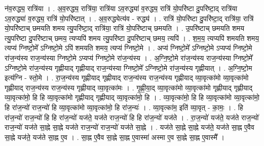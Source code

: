 \documentclass[17pt]{extarticle}
\begin{document}
न॑व॒रुद्ध्य॒ रात्रि॑या । . अ॒व॒रुद्ध्य॒ रात्रि॑या॒ रात्रि॑या ऽव॒रुद्ध्या॑ व॒रुद्ध्य॒ रात्रि॑ यो॒परि॑ष्टा दु॒परि॑ष्टा॒द् रात्रि॑या ऽव॒रुद्ध्या॑ व॒रुद्ध्य॒ रात्रि॑ यो॒परि॑ष्टात् । . अ॒व॒रुद्ध्येत्य॑व - रुद्ध्य॑ । . रात्रि॑ यो॒परि॑ष्टा दु॒परि॑ष्टा॒द् रात्रि॑या॒ रात्रि॑ यो॒परि॑ष्टाच् छमयति शमय त्यु॒परि॑ष्टा॒द् रात्रि॑या॒ रात्रि॑
यो॒परि॑ष्टाच् छमयति । . उ॒परि॑ष्टाच् छमयति शमय त्यु॒परि॑ष्टा दु॒परि॑ष्टाच् छमय॒ त्यप्यपि॑ शमय त्यु॒परि॑ष्टा दु॒परि॑ष्टाच् छमय॒ त्यपि॑ । . श॒म॒य॒ त्यप्यपि॑ शमयति शमय॒ त्यप्य॑ ग्निष्टो॒मे᳚ ऽग्निष्टो॒मे ऽपि॑ शमयति शमय॒ त्यप्य॑ ग्निष्टो॒मे । . अप्य॑ ग्निष्टो॒मे᳚ ऽग्निष्टो॒मे ऽप्यप्य॑ ग्निष्टो॒मे रा॑ज॒न्य॑स्य राज॒न्य॑स्या ग्निष्टो॒मे ऽप्यप्य॑ ग्निष्टो॒मे रा॑ज॒न्य॑स्य । . अ॒ग्नि॒ष्टो॒मे रा॑ज॒न्य॑स्य राज॒न्य॑स्या ग्निष्टो॒मे᳚ ऽग्निष्टो॒मे रा॑ज॒न्य॑स्य गृह्णीयाद् गृह्णीयाद् राज॒न्य॑स्या ग्निष्टो॒मे᳚ ऽग्निष्टो॒मे रा॑ज॒न्य॑स्य गृह्णीयात् । . अ॒ग्नि॒ष्टो॒म इत्य॑ग्नि - स्तो॒मे । . रा॒ज॒न्य॑स्य गृह्णीयाद् गृह्णीयाद् राज॒न्य॑स्य राज॒न्य॑स्य गृह्णीयाद् व्या॒वृत्का॑मो व्या॒वृत्का॑मो गृह्णीयाद् राज॒न्य॑स्य राज॒न्य॑स्य गृह्णीयाद् व्या॒वृत्का॑मः । . गृ॒ह्णी॒या॒द् व्या॒वृत्का॑मो व्या॒वृत्का॑मो गृह्णीयाद् गृह्णीयाद् व्या॒वृत्का॑मो॒ हि हि व्या॒वृत्का॑मो गृह्णीयाद् गृह्णीयाद् व्या॒वृत्का॑मो॒ हि । . व्या॒वृत्का॑मो॒ हि हि व्या॒वृत्का॑मो व्या॒वृत्का॑मो॒ हि रा॑ज॒न्यो॑ राज॒न्यो॑ हि व्या॒वृत्का॑मो व्या॒वृत्का॑मो॒ हि रा॑ज॒न्यः॑ । . व्या॒वृत्का॑म॒ इति॑ व्या॒वृत् - का॒मः॒ । . हि रा॑ज॒न्यो॑ राज॒न्यो॑ हि हि रा॑ज॒न्यो॑ यज॑ते॒ यज॑ते राज॒न्यो॑ हि हि रा॑ज॒न्यो॑ यज॑ते । . रा॒ज॒न्यो॑ यज॑ते॒ यज॑ते राज॒न्यो॑ राज॒न्यो॑ यज॑ते सा॒ह्ने सा॒ह्ने यज॑ते राज॒न्यो॑ राज॒न्यो॑ यज॑ते सा॒ह्ने । . यज॑ते सा॒ह्ने सा॒ह्ने यज॑ते॒ यज॑ते सा॒ह्न ए॒वैव सा॒ह्ने यज॑ते॒ यज॑ते सा॒ह्न ए॒व । . सा॒ह्न ए॒वैव सा॒ह्ने सा॒ह्न ए॒वास्मा॑ अस्मा ए॒व सा॒ह्ने सा॒ह्न ए॒वास्मै᳚ । \newline
\end{document}
